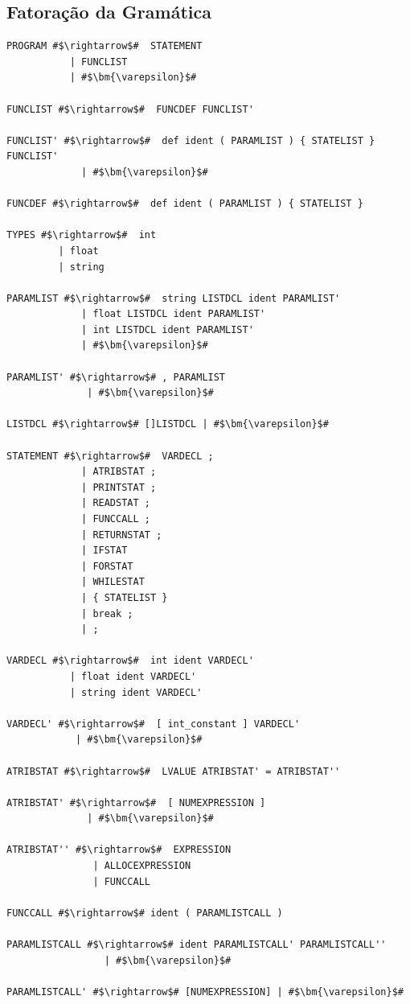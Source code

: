 \documentclass[
	12pt,				%
	openright,			%
	twoside,			%
	a4paper,			%
	english,			%
	french,				%
	spanish,			%
	brazil				%
	]{abntex2}
\begin{document}
\subsection{Fatoração da Gramática}
\begin{lstlisting}[escapechar=\#]
PROGRAM #$\rightarrow$#  STATEMENT 
           | FUNCLIST 
           | #$\bm{\varepsilon}$# 

FUNCLIST #$\rightarrow$#  FUNCDEF FUNCLIST' 

FUNCLIST' #$\rightarrow$#  def ident ( PARAMLIST ) { STATELIST } FUNCLIST'
             | #$\bm{\varepsilon}$# 

FUNCDEF #$\rightarrow$#  def ident ( PARAMLIST ) { STATELIST } 

TYPES #$\rightarrow$#  int 
         | float 
         | string 

PARAMLIST #$\rightarrow$#  string LISTDCL ident PARAMLIST' 
             | float LISTDCL ident PARAMLIST' 
             | int LISTDCL ident PARAMLIST' 
             | #$\bm{\varepsilon}$# 

PARAMLIST' #$\rightarrow$# , PARAMLIST 
              | #$\bm{\varepsilon}$# 

LISTDCL #$\rightarrow$# []LISTDCL | #$\bm{\varepsilon}$# 

STATEMENT #$\rightarrow$#  VARDECL ; 
             | ATRIBSTAT ; 
             | PRINTSTAT ; 
             | READSTAT ; 
             | FUNCCALL ; 
             | RETURNSTAT ; 
             | IFSTAT 
             | FORSTAT 
             | WHILESTAT 
             | { STATELIST } 
             | break ; 
             | ; 

VARDECL #$\rightarrow$#  int ident VARDECL' 
           | float ident VARDECL' 
           | string ident VARDECL' 

VARDECL' #$\rightarrow$#  [ int_constant ] VARDECL' 
            | #$\bm{\varepsilon}$# 

ATRIBSTAT #$\rightarrow$#  LVALUE ATRIBSTAT' = ATRIBSTAT'' 

ATRIBSTAT' #$\rightarrow$#  [ NUMEXPRESSION ] 
              | #$\bm{\varepsilon}$# 

ATRIBSTAT'' #$\rightarrow$#  EXPRESSION 
               | ALLOCEXPRESSION 
               | FUNCCALL 

FUNCCALL #$\rightarrow$# ident ( PARAMLISTCALL ) 

PARAMLISTCALL #$\rightarrow$# ident PARAMLISTCALL' PARAMLISTCALL''
                 | #$\bm{\varepsilon}$# 

PARAMLISTCALL' #$\rightarrow$# [NUMEXPRESSION] | #$\bm{\varepsilon}$#                  


\end{lstlisting}
\end{document}

